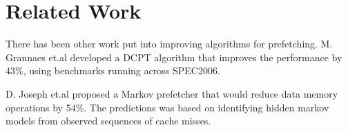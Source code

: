 \section{Related Work}\label{sec:related-work}

There has been other work put into improving algorithms for prefetching. M. Grannaes et.al\cite{grannaes} developed a DCPT algorithm that improves the performance by 43\%, using benchmarks running across SPEC2006.

D. Joseph et.al\cite{Markov} proposed a Markov prefetcher that would reduce data memory operations by 54\%. The predictions was based on identifying hidden markov models from observed sequences of cache misses.
